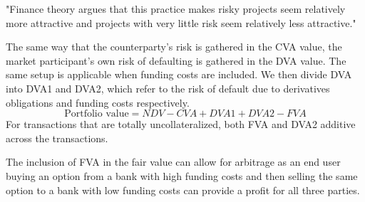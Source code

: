 \documentclass[10pt,a4paper]{article}
\begin{document}
        "Finance theory argues that this practice makes risky projects seem relatively more attractive and projects with very little risk seem relatively less attractive."

        The same way that the counterparty's risk is gathered in the CVA value, the market participant's own risk of defaulting is gathered in the DVA value. The same setup is applicable when funding costs are included. We then divide DVA into DVA1 and DVA2, which refer to the risk of default due to derivatives obligations and funding costs respectively.
        \begin{equation}
            \text{Portfolio value} = NDV - CVA + DVA1 + DVA2 - FVA
        \end{equation}
        For transactions that are totally uncollateralized, both FVA and DVA2 additive across the transactions.

        The inclusion of FVA in the fair value can allow for arbitrage as an end user buying an option from a bank with high funding costs and then selling the same option to a bank with low funding costs can provide a profit for all three parties.
\end{document}
